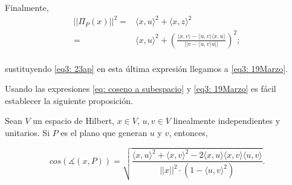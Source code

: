 Finalmente, 
\begin{align*}
|| \Pi_{P}(x) ||^{2} = & 
\langle x,u \rangle^{2} + \langle x,z \rangle^{2} \\
= & \langle x,u \rangle^{2} + 
\left(
\frac{\langle x,v \rangle - \langle u,v \rangle
\langle x,u \rangle}{||v -\langle u,v \rangle u ||}
\right)^{2};\\
\end{align*}

\noindent
sustituyendo \eqref{eq3: 23ap} en esta última expresión
llegamos a \eqref{eq3: 19Marzo}.

\QEDB
\vspace{0.2cm}

Usando las expresiones
\eqref{eq: coseno a subespacio}
y \eqref{eq3: 19Marzo} es fácil establecer
la siguiente proposición.

\begin{prop}
Sean $V$ un espacio de Hilbert, $x \in V$,
	$u,v \in V$ linealmente independientes
	y unitarios. Si $P$ es el plano
	que generan $u$ y $v$, entonces,
	
	
\begin{equation}
\label{eq: coseno a plano}
cos (\measuredangle (x, P)) = 
\sqrt{
\frac{\langle x, u \rangle^{2} +  \langle x, v \rangle^{2}	
	       -2  \langle x, u \rangle \langle x, v \rangle \langle u, v \rangle	}{
	       ||x||^{2} \cdot 
	       (1- \langle u, v 	\rangle^{2})  }}.
\end{equation}
\end{prop}